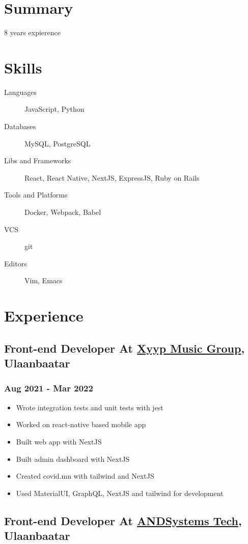 \documentclass[a4]{article}
\author{Enkh-Erdene Bolormaa}
\date{\today}
\title{}
\begin{document}

\section{Summary}
\label{sec:orgf8f8a46}
8 years expierence

\section{Skills}
\label{sec:org6715fb3}
\begin{description}
\item[{Languages}] JavaScript, Python
\item[{Databases}] MySQL, PostgreSQL
\item[{Libs and Frameworks}] React, React Native, NextJS, ExpressJS, Ruby on Rails
\item[{Tools and Platforms}] Docker, Webpack, Babel
\item[{VCS}] git
\item[{Editors}] Vim, Emacs
\end{description}
\section{Experience}
\label{sec:org4d41bcd}
\subsection{Front-end Developer At \href{https://xyyp.mn}{Xyyp Music Group}, Ulaanbaatar}
\label{sec:org4a953ee}
\subsubsection{Aug 2021 - Mar 2022}
\label{sec:org2b94c5b}
\begin{itemize}
\item Wrote integration tests and unit tests with jest
\item Worked on react-native based mobile app
\item Built web app with NextJS
\item Built admin dashboard with NextJS
\item Created covid.mn with tailwind and NextJS
\item Used MaterialUI, GraphQL, NextJS and tailwind for development
\end{itemize}
\subsection{Front-end Developer At \href{https://andsystems.net}{ANDSystems Tech}, Ulaanbaatar}
\label{sec:org1edea0d}
\end{document}
